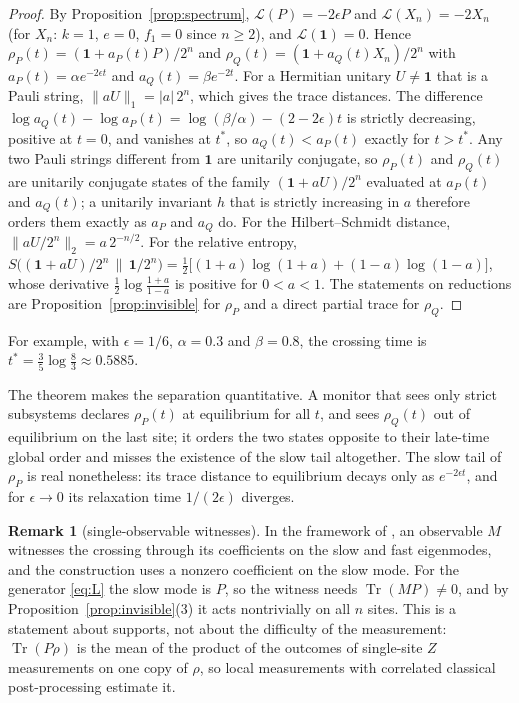 \documentclass[11pt,a4paper]{article}
\theoremstyle{definition}
\newtheorem{remark}[theorem]{Remark}
\theoremstyle{plain}
\DeclareMathOperator{\Tr}{Tr}
\newcommand{\norm}[1]{\lVert#1\rVert}
\newcommand{\one}{\mathbf{1}}
\newcommand{\cL}{\mathcal{L}}
\begin{document}
\begin{proof}
By Proposition~\ref{prop:spectrum}, $\cL(P)=-2\epsilon P$ and
$\cL(X_n)=-2X_n$ (for $X_n$: $k=1$, $e=0$, $f_1=0$ since $n\ge2$), and
$\cL(\one)=0$. Hence $\rho_P(t)=(\one+a_P(t)P)/2^n$ and
$\rho_Q(t)=(\one+a_Q(t)X_n)/2^n$ with $a_P(t)=\alpha e^{-2\epsilon t}$ and
$a_Q(t)=\beta e^{-2t}$. For a Hermitian unitary $U\ne\one$ that is a Pauli
string, $\norm{aU}_1=|a|\,2^n$, which gives the trace distances. The
difference $\log a_Q(t)-\log a_P(t)=\log(\beta/\alpha)-(2-2\epsilon)t$ is
strictly decreasing, positive at $t=0$, and vanishes at $t^*$, so
$a_Q(t)<a_P(t)$ exactly for $t>t^*$. Any two Pauli strings different from
$\one$ are unitarily conjugate, so $\rho_P(t)$ and $\rho_Q(t)$ are unitarily
conjugate states of the family $(\one+aU)/2^n$ evaluated at $a_P(t)$ and
$a_Q(t)$; a unitarily invariant $h$ that is strictly increasing in $a$
therefore orders them exactly as $a_P$ and $a_Q$ do. For the Hilbert--Schmidt
distance, $\norm{aU/2^n}_2=a\,2^{-n/2}$. For the relative entropy,
$S\big((\one+aU)/2^n\,\big\|\,\one/2^n\big)
=\frac12\big[(1+a)\log(1+a)+(1-a)\log(1-a)\big]$, whose derivative
$\frac12\log\frac{1+a}{1-a}$ is positive for $0<a<1$. The statements on
reductions are Proposition~\ref{prop:invisible} for $\rho_P$ and a direct
partial trace for $\rho_Q$.
\end{proof}

For example, with $\epsilon=1/6$, $\alpha=0.3$ and $\beta=0.8$, the
crossing time is $t^*=\tfrac35\log\tfrac83\approx0.5885$.

The theorem makes the separation quantitative. A monitor that sees only
strict subsystems declares $\rho_P(t)$ at equilibrium for all $t$, and sees
$\rho_Q(t)$ out of equilibrium on the last site; it orders the two states
opposite to their late-time global order and misses the existence of the
slow tail altogether. The slow tail of $\rho_P$ is real nonetheless: its
trace distance to equilibrium decays only as $e^{-2\epsilon t}$, and for
$\epsilon\to0$ its relaxation time $1/(2\epsilon)$ diverges.

\begin{remark}[single-observable witnesses]\label{rem:witness}
In the framework of \cite{Choquehuanca2026}, an observable $M$ witnesses the
crossing through its coefficients on the slow and fast eigenmodes, and the
construction uses a nonzero coefficient on the slow mode. For the generator
\eqref{eq:L} the slow mode is $P$, so the witness needs $\Tr(MP)\ne0$, and by
Proposition~\ref{prop:invisible}(3) it acts nontrivially on all $n$ sites.
This is a statement about supports, not about the difficulty of the
measurement: $\Tr(P\rho)$ is the mean of the product of the outcomes of
single-site $Z$ measurements on one copy of $\rho$, so local measurements
with correlated classical post-processing estimate it.
\end{remark}
\end{document}
